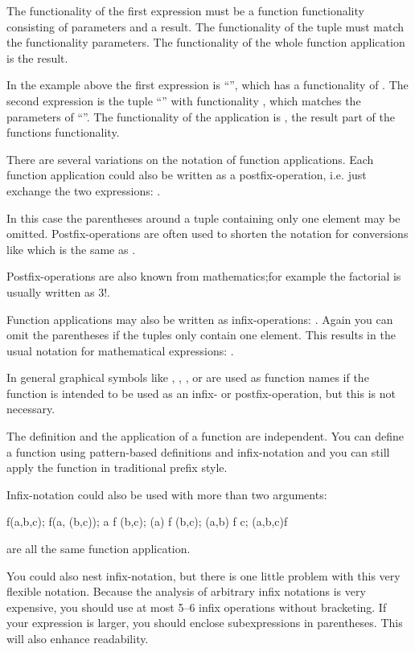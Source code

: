 The functionality of the first expression must be a function
functionality consisting of parameters and a result.
The functionality of the tuple must match the functionality parameters.
The functionality of the whole function application is the result.

In the example above the first expression is ``\pro{+}'', which has a 
functionality of .
The second expression is the tuple ``'' with
functionality , which matches the parameters of
``\pro{+}''.
The functionality of the application is , the result part of the
functions functionality.

\advanced There are several variations on the notation of function
applications.
Each function application could also be written as a postfix-operation,
i.e. just exchange the two expressions: .

In this case the parentheses around a tuple containing only one
element may be omitted.
Postfix-operations are often used to shorten the notation for
conversions like  which is the same as
.

Postfix-operations are also known from mathematics;for example the
factorial is usually written as $3!$.

\medskip
Function applications may also be written as infix-operations:
.
Again you can omit the parentheses if the tuples only contain one
element. This results in the usual notation for mathematical
expressions: .

In general graphical symbols like \pro{+}, \pro{*}, \pro{!}, \pro{::}
or \pro{+\%} are used as function names if the function is intended to
be used as an infix- or postfix-operation, but this is not necessary.

The definition and the application of a function are independent.
You can define a function using pattern-based definitions and
infix-notation and you can still apply the function in traditional
prefix style.

\medskip
Infix-notation could also be used with more than two arguments:
\begin{prog}
     f(a,b,c); f(a, (b,c)); a f (b,c); (a) f (b,c); (a,b) f c; (a,b,c)f 
\end{prog}
are all the same function application.
\bigskip

You could also nest infix-notation, but there is  one little problem
with this very flexible notation. 
Because the analysis of arbitrary infix notations is very expensive,
you should use at most 5--6 infix operations without bracketing. 
If your expression is larger, you should enclose subexpressions in
parentheses.
This will  also enhance readability.

